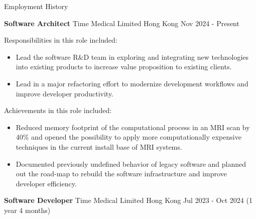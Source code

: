 \documentclass{resume} %
\begin{document}

\begin{rSection}{Employment History}
    \vspace{-1.25em}
    \item \textbf{Software Architect} {Time Medical Limited Hong Kong}
    \hfill Nov 2024 - Present\\
    
    \hspace*{1cm}%
    \begin{minipage}{.8\textwidth}%
        Responsibilities in this role included:
        \begin{itemize}
            \item Lead the software R\&D team in exploring and integrating new technologies into existing products to increase value proposition to existing clients.
            \item Lead in a major refactoring effort to modernize development workflows and improve developer productivity.
        \end{itemize}
        
        Achievements in this role included:
        \begin{itemize}
            \item Reduced memory footprint of the computational process in an MRI scan by 40\% and opened the possibility to apply more computationally expensive techniques in the current install base of MRI systems.
            \item Documented previously undefined behavior of legacy software and planned out the road-map to rebuild the software infrastructure and improve developer efficiency.
        \end{itemize}
    \end{minipage}%
    
    \item \textbf{Software Developer} {Time Medical Limited Hong Kong}
    \hfill Jul 2023 - Oct 2024 (1 year 4 months)\\
    

\end{rSection}
\end{document}
